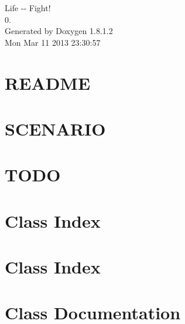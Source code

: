 \documentclass{article}
\begin{document}
\hypersetup{pageanchor=false,citecolor=blue}
\begin{titlepage}
\vspace*{7cm}
\begin{center}
{\Large Life -\/-\/ Fight! \\[1ex]\large 0. }\\
\vspace*{1cm}
{\large Generated by Doxygen 1.8.1.2}\\
\vspace*{0.5cm}
{\small Mon Mar 11 2013 23:30:57}\\
\end{center}
\end{titlepage}
\tableofcontents
{}
\hypersetup{pageanchor=true,citecolor=blue}
\section{R\-E\-A\-D\-M\-E}
\label{md_README}
\hypertarget{md_README}{}

\section{S\-C\-E\-N\-A\-R\-I\-O}
\label{md_SCENARIO}
\hypertarget{md_SCENARIO}{}

\section{T\-O\-D\-O}
\label{md_TODO}
\hypertarget{md_TODO}{}

\section{Class Index}

\section{Class Index}

\section{Class Documentation}


\printindex
\end{document}
